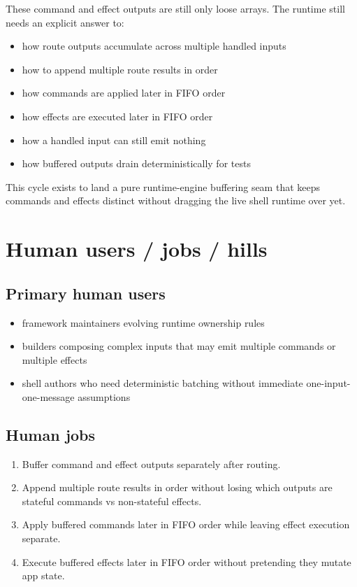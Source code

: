 These command and effect outputs are still only loose arrays. The runtime still needs an explicit answer to:

\begin{itemize}
\tightlist
\item
  how route outputs accumulate across multiple handled inputs
\item
  how to append multiple route results in order
\item
  how commands are applied later in FIFO order
\item
  how effects are executed later in FIFO order
\item
  how a handled input can still emit nothing
\item
  how buffered outputs drain deterministically for tests
\end{itemize}

This cycle exists to land a pure runtime-engine buffering seam that keeps commands and effects distinct without dragging the live shell runtime over yet.

\section{Human users / jobs / hills}\label{record-153-human-users-jobs-hills}

\subsection{Primary human users}\label{record-153-primary-human-users}

\begin{itemize}
\tightlist
\item
  framework maintainers evolving runtime ownership rules
\item
  builders composing complex inputs that may emit multiple commands or multiple effects
\item
  shell authors who need deterministic batching without immediate one-input-one-message assumptions
\end{itemize}

\subsection{Human jobs}\label{record-153-human-jobs}

\begin{enumerate}
\def\labelenumi{\arabic{enumi}.}
\tightlist
\item
  Buffer command and effect outputs separately after routing.
\item
  Append multiple route results in order without losing which outputs are stateful commands vs non-stateful effects.
\item
  Apply buffered commands later in FIFO order while leaving effect execution separate.
\item
  Execute buffered effects later in FIFO order without pretending they mutate app state.
\end{enumerate}

